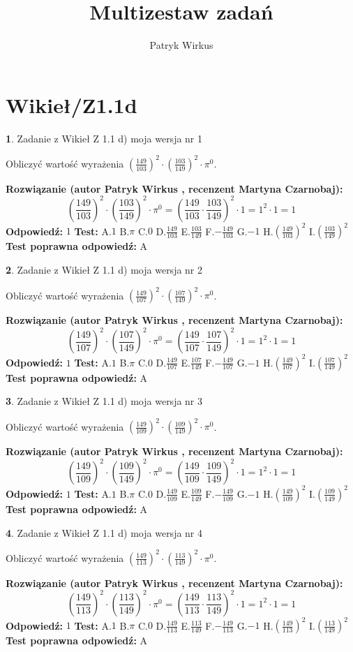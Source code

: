 \documentclass[12pt, a4paper]{article}
\title{Multizestaw zadań}
\author{Patryk Wirkus}
\date{}
\theoremstyle{definition} %
\newtheorem{zad}{}
\newcommand{\kategoria}[1]{\section{#1}}
\newcommand{\zadStart}[1]{\begin{zad}#1\newline}
\newcommand{\zadStop}{\end{zad}}
\newcommand{\rozwStart}[2]{\noindent \textbf{Rozwiązanie (autor #1 , recenzent #2): }\newline}
\newcommand{\rozwStop}{\newline}
\newcommand{\odpStart}{\noindent \textbf{Odpowiedź:}\newline}
\newcommand{\odpStop}{\newline}
\newcommand{\testStart}{\noindent \textbf{Test:}\newline}
\newcommand{\testStop}{\newline}
\newcommand{\kluczStart}{\noindent \textbf{Test poprawna odpowiedź:}\newline}
\newcommand{\kluczStop}{\newline}
\begin{document}
\maketitle

\kategoria{Wikieł/Z1.1d}


\zadStart{Zadanie z Wikieł Z 1.1 d) moja wersja nr 1}

Obliczyć wartość wyrażenia $(\frac{149}{103})^{2} \cdot (\frac{103}{149})^{2} \cdot \pi^{0}$.
\zadStop
\rozwStart{Patryk Wirkus}{Martyna Czarnobaj}
$$(\frac{149}{103})^{2} \cdot (\frac{103}{149})^{2} \cdot \pi^{0} = (\frac{149}{103} \cdot \frac{103}{149})^{2} \cdot 1 = 1^{2} \cdot 1 = 1$$
\rozwStop
\odpStart
$1$
\odpStop
\testStart
A.$1$ B.$\pi$ C.$0$ D.$\frac{149}{103}$ E.$\frac{103}{149}$
F.$-\frac{149}{103}$ G.$-1$
H.$(\frac{149}{103})^{2}$
I.$(\frac{103}{149})^{2}$
\testStop
\kluczStart
A
\kluczStop



\zadStart{Zadanie z Wikieł Z 1.1 d) moja wersja nr 2}

Obliczyć wartość wyrażenia $(\frac{149}{107})^{2} \cdot (\frac{107}{149})^{2} \cdot \pi^{0}$.
\zadStop
\rozwStart{Patryk Wirkus}{Martyna Czarnobaj}
$$(\frac{149}{107})^{2} \cdot (\frac{107}{149})^{2} \cdot \pi^{0} = (\frac{149}{107} \cdot \frac{107}{149})^{2} \cdot 1 = 1^{2} \cdot 1 = 1$$
\rozwStop
\odpStart
$1$
\odpStop
\testStart
A.$1$ B.$\pi$ C.$0$ D.$\frac{149}{107}$ E.$\frac{107}{149}$
F.$-\frac{149}{107}$ G.$-1$
H.$(\frac{149}{107})^{2}$
I.$(\frac{107}{149})^{2}$
\testStop
\kluczStart
A
\kluczStop



\zadStart{Zadanie z Wikieł Z 1.1 d) moja wersja nr 3}

Obliczyć wartość wyrażenia $(\frac{149}{109})^{2} \cdot (\frac{109}{149})^{2} \cdot \pi^{0}$.
\zadStop
\rozwStart{Patryk Wirkus}{Martyna Czarnobaj}
$$(\frac{149}{109})^{2} \cdot (\frac{109}{149})^{2} \cdot \pi^{0} = (\frac{149}{109} \cdot \frac{109}{149})^{2} \cdot 1 = 1^{2} \cdot 1 = 1$$
\rozwStop
\odpStart
$1$
\odpStop
\testStart
A.$1$ B.$\pi$ C.$0$ D.$\frac{149}{109}$ E.$\frac{109}{149}$
F.$-\frac{149}{109}$ G.$-1$
H.$(\frac{149}{109})^{2}$
I.$(\frac{109}{149})^{2}$
\testStop
\kluczStart
A
\kluczStop



\zadStart{Zadanie z Wikieł Z 1.1 d) moja wersja nr 4}

Obliczyć wartość wyrażenia $(\frac{149}{113})^{2} \cdot (\frac{113}{149})^{2} \cdot \pi^{0}$.
\zadStop
\rozwStart{Patryk Wirkus}{Martyna Czarnobaj}
$$(\frac{149}{113})^{2} \cdot (\frac{113}{149})^{2} \cdot \pi^{0} = (\frac{149}{113} \cdot \frac{113}{149})^{2} \cdot 1 = 1^{2} \cdot 1 = 1$$
\rozwStop
\odpStart
$1$
\odpStop
\testStart
A.$1$ B.$\pi$ C.$0$ D.$\frac{149}{113}$ E.$\frac{113}{149}$
F.$-\frac{149}{113}$ G.$-1$
H.$(\frac{149}{113})^{2}$
I.$(\frac{113}{149})^{2}$
\testStop
\kluczStart
A
\kluczStop
\end{document}
